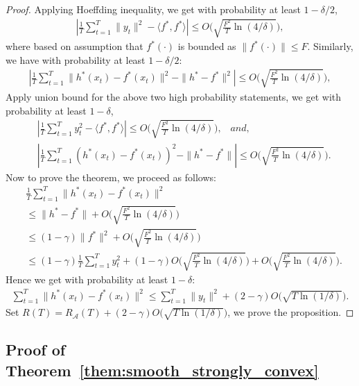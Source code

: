 \begin{proof}
Applying Hoeffding inequality, we get with probability at least $1-\delta/2$,
\begin{align}
\label{eq:high_prob_1}
|\frac{1}{T}\sum_{t=1}^T \|y_t\|^2 - \langle f^*, f^*\rangle| \leq O\big(\sqrt{\frac{F^2}{T}\ln(4/\delta)}\Big),
\end{align} where based on assumption that $f^*(\cdot)$ is bounded as $\|f^*(\cdot)\|\leq F$. Similarly, we have with probability at least $1-\delta/2$:
\begin{align}
|\frac{1}{T}\sum_{t=1}^T \|h^*(x_t) - f^*(x_t)\|^2 - \|h^* - f^* \|^2| \leq O\Big(\sqrt{\frac{F^2}{T}\ln(4/\delta)}\Big),
\end{align}
Apply union bound for the above two high probability statements, we get with probability at least $1-\delta$,
\begin{align}
&|\frac{1}{T}\sum_{t=1}^T y_t^2 - \langle f^*, f^*\rangle| \leq O\Big(\sqrt{\frac{F^2}{T}\ln(4/\delta)}\Big), \;\;\; and,\nonumber\\
&|\frac{1}{T}\sum_{t=1}^T (h^*(x_t) - f^*(x_t))^2 - \|h^* - f^* \|| \leq O\Big(\sqrt{\frac{F^2}{T}\ln(4/\delta)}\Big). 
\end{align} Now to prove the theorem, we proceed as follows:
\begin{align}
&\frac{1}{T}\sum_{t=1}^T \|h^*(x_t) - f^*(x_t)\|^2 \nonumber\\
&\leq  \|h^* - f^* \| + O\Big(\sqrt{\frac{F^2}{T}\ln(4/\delta)}\Big)\nonumber\\
&\leq (1-\gamma)\|f^*\|^2+O\Big(\sqrt{\frac{F^2}{T}\ln(4/\delta)}\Big)\nonumber\\
&\leq (1-\gamma)\frac{1}{T}\sum_{t=1}^T y_t^2 + (1-\gamma)O\Big(\sqrt{\frac{F^2}{T}\ln(4/\delta)}\Big) + O\Big(\sqrt{\frac{F^2}{T}\ln(4/\delta)}\Big).
\end{align} Hence we get with probability at least $1-\delta$:
\begin{align}
\sum_{t=1}^T \|h^*(x_t) - f^*(x_t)\|^2 \leq \sum_{t=1}^T \|y_t\|^2 + (2-\gamma)O\Big(\sqrt{ T\ln(1/\delta)}\Big).
\end{align} Set $R(T) = R_{\mathcal{A}}(T) + (2-\gamma)O\Big(\sqrt{ T\ln(1/\delta)}\Big)$, we prove the proposition. 
\end{proof}




\subsection{Proof of Theorem~\ref{them:smooth_strongly_convex}}
\label{sec:proof_smooth_strongly_convex}

